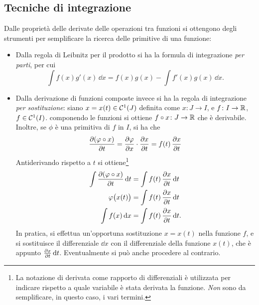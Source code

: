 \subsection*{Tecniche di integrazione}
Dalle proprietà delle derivate delle operazioni tra funzioni si ottengono degli strumenti per semplificare la ricerca delle primitive di una funzione:
\begin{itemize}
\item Dalla regola di Leibnitz per il prodotto si ha la formula di integrazione \emph{per parti}, per cui
\[
\int f(x)g'(x)\,\dd x=f(x)g(x)-\int f'(x)g(x)\,\dd x.
\]
\item Dalla derivazione di funzioni composte invece si ha la regola di integrazione \emph{per sostituzione}: siano $x=x(t)\in\mathcal{C}^{{1}}(J)$ definita come $x\colon J\to I$, e $f\colon I\to\mathbb{R}$, $f\in\mathcal{C}^{{1}}(I)$. componendo le funzioni si ottiene $f\circ x\colon J\to\mathbb{R}$ che è derivabile. Inoltre, se $\phi$ è una primitiva di $f$ in $I$, si ha che
\[
\frac{\partial {(\varphi\circ x)}}{\partial {t}}=\frac{\partial {\varphi}}{\partial {x}}\cdot\frac{\partial {x}}{\partial {t}}=f(t)\,\frac{\partial {x}}{\partial {t}}
\]
Antiderivando rispetto a $t$ si ottiene\footnote{La notazione di derivata come rapporto di differenziali è utilizzata per indicare rispetto a quale variabile è stata derivata la funzione. \emph{Non} sono da semplificare, in questo caso, i vari termini.}
\begin{align*}
\int\frac{\partial {(\varphi\circ x)}}{\partial {t}}\,\textup{d} t&=\int f(t)\,\frac{\partial {x}}{\partial {t}}\,\textup{d} t\\
\varphi\big(x(t)\big)&=\int f(t)\,\frac{\partial {x}}{\partial {t}}\,\textup{d} t\\
\int f(x)\,\textup{d} x&=\int f(t)\,\frac{\partial {x}}{\partial {t}}\,\textup{d} t.
\end{align*}
In pratica, si effettua un'opportuna sostituzione $x=x(t)$ nella funzione $f$, e si sostituisce il differenziale $\dd x$ con il differenziale della funzione $x(t)$, che è appunto $\frac{\partial {x}}{\partial {t}}\,\textup{d} t$. Eventualmente si può anche procedere al contrario.
\end{itemize}

